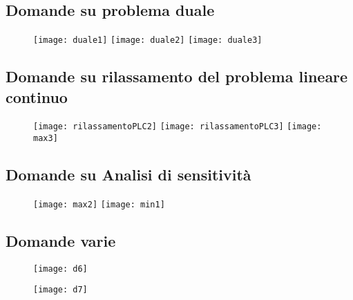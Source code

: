 \documentclass[\main/main.tex]{subfiles}
\begin{document}
\subsection{Domande su problema duale}
\begin{figure}
  \texttt{[image: duale1]}
  \texttt{[image: duale2]}
  \texttt{[image: duale3]}
\end{figure}
\subsection{Domande su rilassamento del problema lineare continuo}
\begin{figure}
  \texttt{[image: rilassamentoPLC2]}
  \texttt{[image: rilassamentoPLC3]}
  \texttt{[image: max3]}
\end{figure}
\subsection{Domande su Analisi di sensitività}
\begin{figure}
  \texttt{[image: max2]}
  \texttt{[image: min1]}
\end{figure}
\subsection{Domande varie}
\begin{figure}
  \texttt{[image: d6]}
\end{figure}
\begin{figure}
  \texttt{[image: d7]}
\end{figure}
\end{document}
